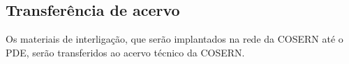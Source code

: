 \subsection{Transferência de acervo}

Os materiais de interligação, que serão implantados na rede da COSERN até o PDE, serão transferidos ao acervo técnico da COSERN.